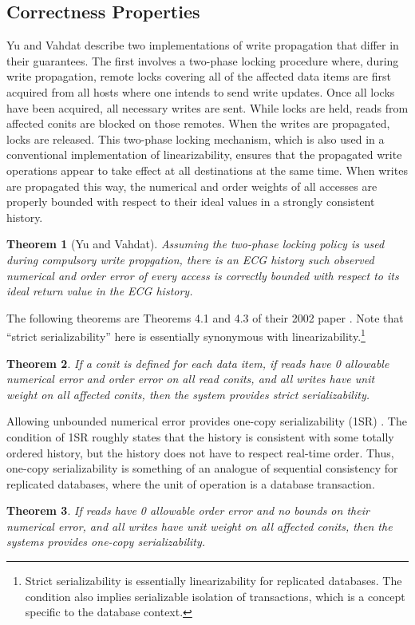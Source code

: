\documentclass[]             %
{NASA}                       %
\newtheorem{theorem}{Theorem}[section]
\theoremstyle{definition}
\begin{document}
\subsection{Correctness Properties}
\label{ssec:conit-correctness}
Yu and Vahdat describe two implementations of write propagation that
differ in their guarantees. The first involves a two-phase locking
procedure where, during write propagation, remote locks covering all
of the affected data items are first acquired from all hosts where one
intends to send write updates. Once all locks have been acquired, all
necessary writes are sent. While locks are held, reads from affected
conits are blocked on those remotes. When the writes are propagated,
locks are released. This two-phase locking mechanism, which is also
used in a conventional implementation of linearizability, ensures that
the propagated write operations appear to take effect at all
destinations at the same time. When writes are propagated this way,
the numerical and order weights of all accesses are properly bounded
with respect to their ideal values in a strongly consistent history.
\begin{theorem}[Yu and Vahdat]
  \label{thm:conit-correct}
  Assuming the two-phase locking policy is used during compulsory
  write propgation, there is an ECG history such observed numerical
  and order error of every access is correctly bounded with respect to
  its ideal return value in the ECG history.
\end{theorem}

The following theorems are Theorems 4.1 and 4.3 of their 2002 paper
\cite{2002tact}. Note that ``strict serializability'' here is
essentially synonymous with linearizability.\footnote{Strict
  serializability is essentially linearizability for replicated
  databases. The condition also implies serializable isolation of
  transactions, which is a concept specific to the database context.}
\begin{theorem}
  \label{thm:conit-correct-linearizability}
  If a conit is defined for each data item, if reads have 0 allowable
  numerical error and order error on all read conits, and all writes
  have unit weight on all affected conits, then the system provides
  strict serializability.
\end{theorem}

Allowing unbounded numerical error provides one-copy serializability
(1SR) \cite{1984:1sr}. The condition of 1SR roughly states that the
history is consistent with some totally ordered history, but the
history does not have to respect real-time order. Thus, one-copy
serializability is something of an analogue of sequential consistency
for replicated databases, where the unit of operation is a database
transaction.
\begin{theorem}
    \label{thm:conit-correct-1sr}
  If reads have 0 allowable order error and no bounds on their
  numerical error, and all writes have unit weight on all affected
  conits, then the systems provides one-copy serializability.
\end{theorem}
\end{document}
